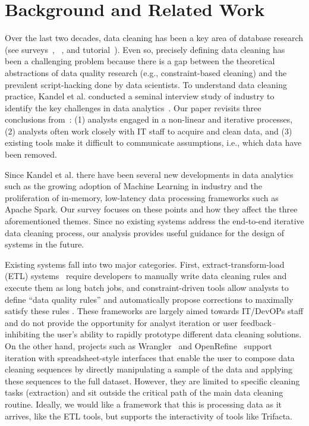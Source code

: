 \section{Background and Related Work}\label{sec:relwork}
Over the last two decades, data cleaning has been a key area of database research (see surveys~\cite{Dasu:2003:EDM:861869}, ~\cite{Rahm00datacleaning}, and tutorial~\cite{chu2016tut}).
Even so, precisely defining data cleaning has been a challenging problem because there is a gap between the theoretical abstractions of data quality research (e.g., constraint-based cleaning) and the prevalent script-hacking done by data scientists.
To understand data cleaning practice, Kandel et al. conducted a seminal interview study of industry to identify the key challenges in data analytics~\cite{kandel2012}. 
Our paper revisits three conclusions from~\cite{kandel2012}: (1) analysts engaged in a non-linear and iterative processes, (2) analysts often work closely with IT staff to acquire and clean data, and (3) existing tools make it difficult to communicate assumptions, i.e., which data have been removed.

Since Kandel et al. there have been several new developments in data analytics such as the growing adoption of Machine Learning in industry and the proliferation of in-memory, low-latency data processing frameworks such as Apache Spark. 
Our survey focuses on these points and how they affect the three aforementioned themes.
Since no existing systems address the end-to-end iterative data cleaning process, our analysis provides useful guidance for the design of systems in the future.

Existing systems fall into two major categories.
First, extract-transform-load (ETL) systems~\cite{informatica,talend,apachefalcon} require developers to manually write data cleaning rules and execute them as long batch jobs, 
and constraint-driven tools allow analysts to define ``data quality rules'' and automatically propose corrections to maximally satisfy these rules \cite{DBLP:conf/sigmod/DallachiesaEEEIOT13}.
These frameworks are largely aimed towards IT/DevOPs staff and do not provide the opportunity for analyst iteration or user feedback-- inhibiting the user's ability to rapidly prototype different data cleaning solutions.
On the other hand, projects such as Wrangler~\cite{wrangler,trifacta} and OpenRefine~\cite{openrefine} support iteration with spreadsheet-style interfaces that enable the user to compose data cleaning sequences by directly manipulating a sample of the data and applying these sequences to the full dataset.
However, they are limited to specific cleaning tasks (extraction) and sit outside the critical path of the main data cleaning routine. 
Ideally, we would like a framework that this is processing data as it arrives, like the ETL tools, but supports the interactivity of tools like Trifacta.

